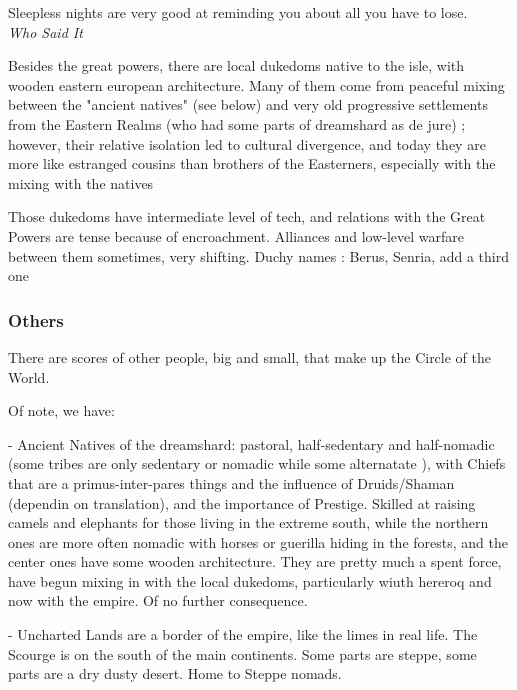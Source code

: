\begin{rpg-quotebox}
    Sleepless nights are very good at reminding you about all you have to lose. \\ \textendash \textit{Who Said It}
\end{rpg-quotebox}

Besides the great powers, there are local dukedoms native to the isle, with wooden eastern european architecture. 
Many of them come from peaceful mixing between the "ancient natives" (see below) and very old progressive settlements from the Eastern Realms (who had some parts of dreamshard as de jure) ; however, their relative isolation led to cultural divergence, and today they are more like estranged cousins than brothers of the Easterners, especially with the mixing with the natives



Those dukedoms have intermediate level of tech, and relations with the Great Powers are tense because of encroachment. Alliances and low-level warfare between them sometimes, very shifting.
	Duchy names : Berus, Senria, add a third one

\subsubsection{Others}

There are scores of other people, big and small, that make up the Circle of the World.

Of note, we have:

- Ancient Natives of the dreamshard: pastoral, half-sedentary and half-nomadic (some tribes are only sedentary or nomadic while some alternatate ), with Chiefs that are a primus-inter-pares things and the influence of Druids/Shaman (dependin on translation), and the importance of Prestige. Skilled at raising camels and elephants for those living in the extreme south, while the northern ones are more often nomadic with horses or guerilla hiding in the forests, and the center ones have some wooden architecture. They are pretty much a spent force, have begun mixing in with the local dukedoms, particularly wiuth hereroq and now with the empire. Of no further consequence.

- Uncharted Lands are a border of the empire, like the limes in real life.
The Scourge is on the south of the main continents. Some parts are steppe, some parts are a dry dusty desert. Home to Steppe nomads.







